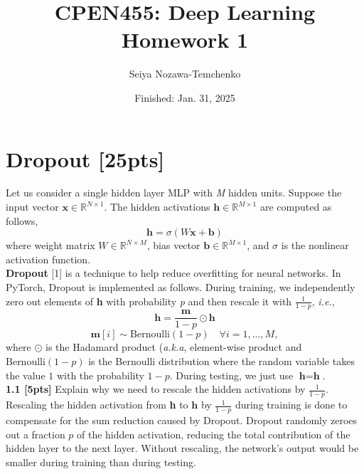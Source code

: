 \documentclass{article}
\title{CPEN455: Deep Learning \\ Homework 1}
\author{Seiya Nozawa-Temchenko}
\date{Finished: Jan. 31, 2025}
\begin{document}
\pagestyle{fancy}
\fancyhead{} %

\maketitle
\thispagestyle{fancy}


\section{Dropout [25pts]}
Let us consider a single hidden layer MLP with \textit{M} hidden units. Suppose the input vector $\textbf{x} \in \mathbb{R}^{N \times 1}$. The hidden activations $\textbf{h} \in \mathbb{R}^{M \times 1}$ are computed as follows,
\begin{equation}
    \textbf{h}=\sigma (W \textbf{x}+\textbf{b})
\end{equation}
where weight matrix $W \in \mathbb{R}^{N \times M}$, bias vector $\textbf{b} \in \mathbb{R}^{M \times 1}$, and $\sigma$ is the nonlinear activation function.\\

\textbf{Dropout} [1]  is a technique to help reduce overfitting for neural networks. In PyTorch, Dropout is implemented as follows. During training, we independently zero out elements of \textbf{h} with probability
\textit{p} and then rescale it with $\frac{1}{1-p}$, \textit{i.e.},
\begin{equation}
    \textbf{\~h}=\frac{\textbf{m}}{1-p} \odot \textbf{h}
\end{equation}
\begin{equation}
    \textbf{m}[i] \sim \text{Bernoulli}(1-p) \quad \forall i =1,...,M,
\end{equation}
where $\odot$ is the Hadamard product (\textit{a.k.a}, element-wise product and $\text{Bernoulli}(1-p)$ is the Bernoulli distribution where the random variable takes the value $1$ with the probability $1-p$. During testing, we just use $\textbf{\~h}=\textbf{h}$.\\

\noindent
\textbf{1.1 [5pts]} Explain why we need to rescale the hidden activations by $\frac{1}{1-p}$.\\

{\color{blue} 
Rescaling the hidden activation from \textbf{h} to $\textbf{\~h}$ by $\frac{1}{1-p}$ during training is done to compensate for the sum reduction caused by Dropout. Dropout randomly zeroes out a fraction $p$ of the hidden activation, reducing the total contribution of the hidden layer to the next layer. Without rescaling, the network's output would be smaller during training than during testing.} \\
\end{document}
